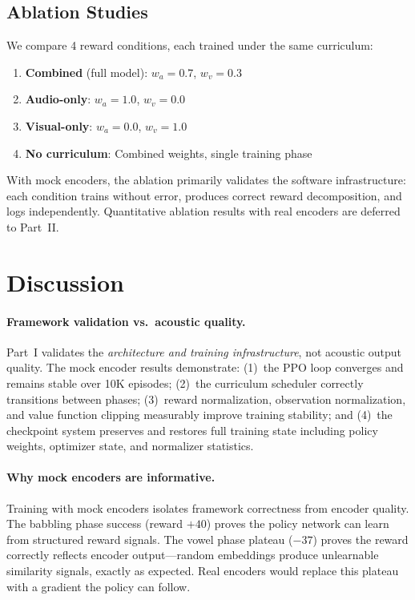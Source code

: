 \documentclass[11pt, a4paper]{article}
\begin{document}
\subsection{Ablation Studies}
\label{sec:ablations}

We compare 4 reward conditions, each trained under the same curriculum:
\begin{enumerate}
    \item \textbf{Combined} (full model): $w_a = 0.7$, $w_v = 0.3$
    \item \textbf{Audio-only}: $w_a = 1.0$, $w_v = 0.0$
    \item \textbf{Visual-only}: $w_a = 0.0$, $w_v = 1.0$
    \item \textbf{No curriculum}: Combined weights, single training phase
\end{enumerate}

With mock encoders, the ablation primarily validates the software infrastructure: each condition trains without error, produces correct reward decomposition, and logs independently. Quantitative ablation results with real encoders are deferred to Part~II.

\section{Discussion}
\label{sec:discussion}

\paragraph{Framework validation vs.\ acoustic quality.}
Part~I validates the \emph{architecture and training infrastructure}, not acoustic output quality. The mock encoder results demonstrate: (1)~the PPO loop converges and remains stable over 10K episodes; (2)~the curriculum scheduler correctly transitions between phases; (3)~reward normalization, observation normalization, and value function clipping measurably improve training stability; and (4)~the checkpoint system preserves and restores full training state including policy weights, optimizer state, and normalizer statistics.

\paragraph{Why mock encoders are informative.}
Training with mock encoders isolates framework correctness from encoder quality. The babbling phase success (reward $+40$) proves the policy network can learn from structured reward signals. The vowel phase plateau ($-37$) proves the reward correctly reflects encoder output---random embeddings produce unlearnable similarity signals, exactly as expected. Real encoders would replace this plateau with a gradient the policy can follow.
\end{document}
